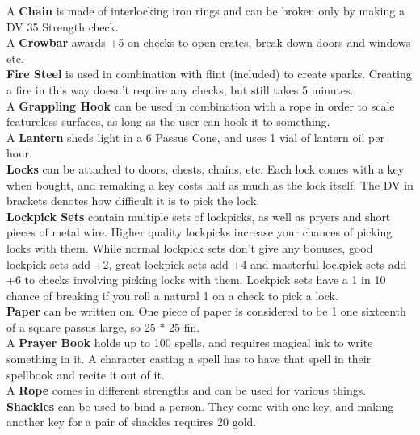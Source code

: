 A \textbf{Chain} is made of interlocking iron rings and can be broken only by making a DV 35 Strength check.\\

A \textbf{Crowbar} awards +5 on checks to open crates, break down doors and windows etc.\\

\textbf{Fire Steel} is used in combination with flint (included) to create sparks. Creating a fire in this way doesn't require any checks, but still takes 5 minutes.\\

A \textbf{Grappling Hook} can be used in combination with a rope in order to scale featureless surfaces, as long as the user can hook it to something.\\

A \textbf{Lantern} sheds light in a 6 Passus Cone, and uses 1 vial of lantern oil per hour.\\

\textbf{Locks} can be attached to doors, chests, chains, etc. Each lock comes with a key when bought, and remaking a key costs half as much as the lock itself. The DV in brackets denotes how difficult it is to pick the lock.\\

\textbf{Lockpick Sets} contain multiple sets of lockpicks, as well as pryers and short pieces of metal wire. Higher quality lockpicks increase your chances of picking locks with them. While normal lockpick sets don't give any bonuses, good lockpick sets add +2, great lockpick sets add +4 and masterful lockpick sets add +6 to checks involving picking locks with them. Lockpick sets have a 1 in 10 chance of breaking if you roll a natural 1 on a check to pick a lock.\\

\textbf{Paper} can be written on. One piece of paper is considered to be 1 one sixteenth of a square passus large, so 25 * 25 fin.\\

A \textbf{Prayer Book} holds up to 100 spells, and requires magical ink to write something in it. A character casting a spell has to have that spell in their spellbook and recite it out of it.\\

A \textbf{Rope} comes in different strengths and can be used for various things.\\

\textbf{Shackles} can be used to bind a person. They come with one key, and making another key for a pair of shackles requires 20 gold.\\

